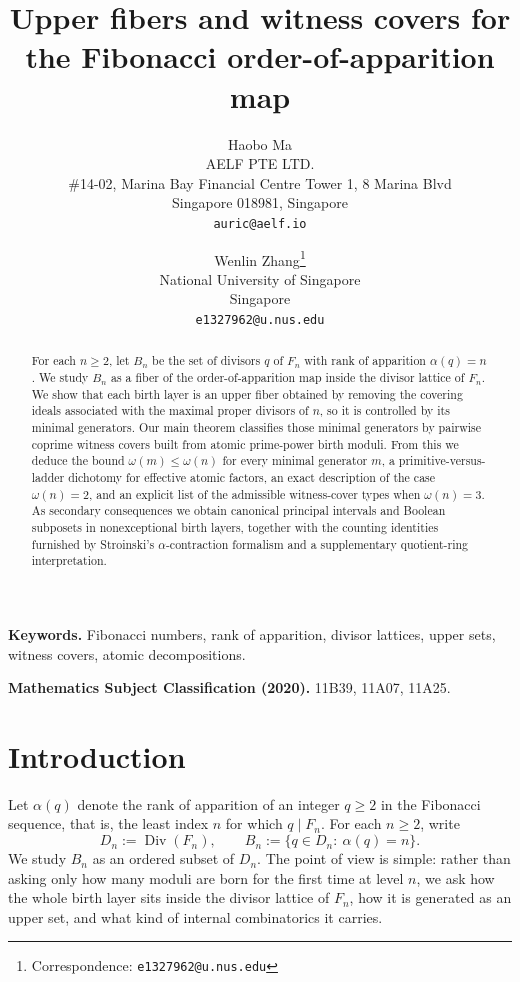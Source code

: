 \documentclass[11pt,letterpaper]{article}
\title{Upper fibers and witness covers for the Fibonacci order-of-apparition map}
\author{
Haobo Ma\\
AELF PTE LTD.\\
\#14-02, Marina Bay Financial Centre Tower 1, 8 Marina Blvd\\
Singapore 018981, Singapore\\
\texttt{auric@aelf.io}
\and
Wenlin Zhang\thanks{Correspondence: \texttt{e1327962@u.nus.edu}}\\
National University of Singapore\\
Singapore\\
\texttt{e1327962@u.nus.edu}
}
\date{}
\numberwithin{equation}{section}
\theoremstyle{plain}
\theoremstyle{definition}
\theoremstyle{remark}
\begin{document}
\maketitle

\begin{abstract}
For each $n\ge 2$, let $B_n$ be the set of divisors $q$ of $F_n$ with
rank of apparition $\alpha(q)=n$. We study $B_n$ as a fiber of the
order-of-apparition map inside the divisor lattice of $F_n$. We show that each
birth layer is an upper fiber obtained by removing the covering ideals
associated with the maximal proper divisors of $n$, so it is controlled by its
minimal generators. Our main theorem classifies those minimal generators by
pairwise coprime witness covers built from atomic prime-power birth moduli.
From this we deduce the bound $\omega(m)\le \omega(n)$ for every minimal
generator $m$, a primitive-versus-ladder dichotomy for effective atomic
factors, an exact description of the case $\omega(n)=2$, and an explicit list
of the admissible witness-cover types when $\omega(n)=3$. As secondary
consequences we obtain canonical principal intervals and Boolean subposets in
nonexceptional birth layers, together with the counting identities furnished by
Stroinski's $\alpha$-contraction formalism and a supplementary quotient-ring
interpretation.
\end{abstract}

\medskip
\noindent\textbf{Keywords.} Fibonacci numbers, rank of apparition, divisor
lattices, upper sets, witness covers, atomic decompositions.

\smallskip
\noindent\textbf{Mathematics Subject Classification (2020).}
11B39, 11A07, 11A25.

\section{Introduction}

Let $\alpha(q)$ denote the rank of apparition of an integer $q\ge 2$ in the
Fibonacci sequence, that is, the least index $n$ for which $q\mid F_n$. For
each $n\ge 2$, write
\[
D_n:=\operatorname{Div}(F_n),
\qquad
B_n:=\{q\in D_n:\ \alpha(q)=n\}.
\]
We study $B_n$ as an ordered subset of $D_n$. The point of view is simple:
rather than asking only how many moduli are born for the first time at level
$n$, we ask how the whole birth layer sits inside the divisor lattice of
$F_n$, how it is generated as an upper set, and what kind of internal
combinatorics it carries.
\end{document}
